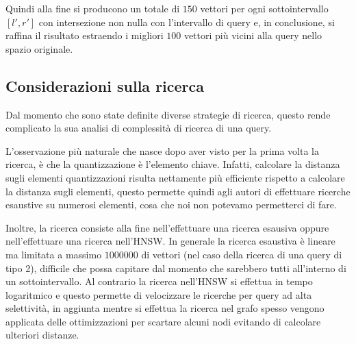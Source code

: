 Quindi alla fine si producono un totale di $150$ vettori per ogni sottointervallo
$[l',r']$ con intersezione non nulla con l'intervallo di query e, in conclusione, 
si raffina il risultato estraendo i migliori $100$ vettori più vicini alla query 
nello spazio originale.   

\subsection{Considerazioni sulla ricerca}

Dal momento che sono state definite diverse strategie di ricerca, questo rende 
complicato la sua analisi di complessità di ricerca di una query.

L'osservazione più naturale che nasce dopo aver visto per la prima volta la ricerca,
è che la quantizzazione è l'elemento chiave. Infatti, calcolare la distanza sugli 
elementi quantizzazioni risulta nettamente più efficiente rispetto a calcolare la 
distanza sugli elementi, questo permette quindi agli autori di effettuare ricerche 
esaustive su numerosi elementi, cosa che noi non potevamo permetterci di fare.

Inoltre, la ricerca consiste alla fine nell'effettuare una ricerca esausiva 
oppure nell'effettuare una ricerca nell'HNSW. In generale la ricerca esaustiva è 
lineare ma limitata a massimo $1000000$ di vettori (nel caso della ricerca di una 
query di tipo 2), difficile che possa capitare dal momento che sarebbero tutti 
all'interno di un sottointervallo. Al contrario la ricerca nell'HNSW si effettua 
in tempo logaritmico e questo permette di velocizzare le ricerche per query ad 
alta selettività, in aggiunta mentre si effettua la ricerca nel grafo spesso vengono 
applicata delle ottimizzazioni per scartare alcuni nodi evitando di calcolare 
ulteriori distanze. 

